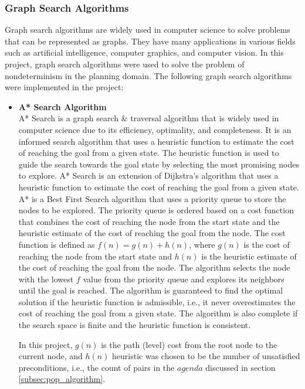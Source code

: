 \subsubsection{Graph Search Algorithms} \label{subsec:graph_search_algorithms}
Graph search algorithms are widely used in computer science to solve problems that can be represented as graphs. They have many applications in various fields such as artificial intelligence, computer graphics, and computer vision. In this project, graph search algorithms were used to solve the problem of nondeterminism in the planning domain.
The following graph search algorithms were implemented in the project:
\begin{itemize}

    \item \textbf{\acf{A*} Search Algorithm} \label{subsubsec:a_star} \\
          \ac{A*} Search is a graph search \& traversal algorithm that is widely used in computer science due to its efficiency, optimality, and completeness. It is an informed search algorithm that uses a heuristic function to estimate the cost of reaching the goal from a given state. The heuristic function is used to guide the search towards the goal state by selecting the most promising nodes to explore. \ac{A*} Search is an extension of Dijkstra's algorithm that uses a heuristic function to estimate the cost of reaching the goal from a given state. \ac{A*} is a Best First Search algorithm that uses a priority queue to store the nodes to be explored. The priority queue is ordered based on a cost function that combines the cost of reaching the node from the start state and the heuristic estimate of the cost of reaching the goal from the node. The cost function is defined as $f(n) = g(n) + h(n)$, where $g(n)$ is the cost of reaching the node from the start state and $h(n)$ is the heuristic estimate of the cost of reaching the goal from the node. The algorithm selects the node with the lowest $f$ value from the priority queue and explores its neighbors until the goal is reached. The algorithm is guaranteed to find the optimal solution if the heuristic function is admissible, i.e., it never overestimates the cost of reaching the goal from a given state. The algorithm is also complete if the search space is finite and the heuristic function is consistent.

          In this project, $g(n)$ is the path (level) cost from the root node to the current node, and $h(n)$ heuristic was chosen to be the number of unsatisfied preconditions, i.e., the count of pairs in the $agenda$ discussed in section {\ref{subsec:pop_algorithm}}.


\end{itemize}

